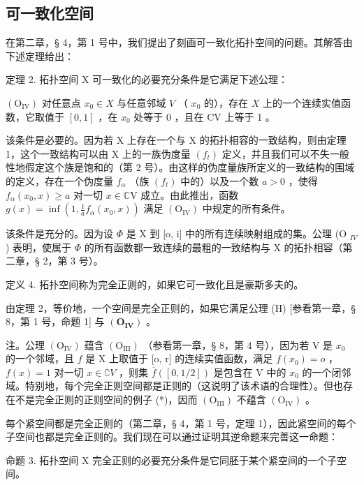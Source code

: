 \subsection{可一致化空间}

在第二章，§ 4，第 1 号中，我们提出了刻画可一致化拓扑空间的问题。其解答由下述定理给出：

定理 2. 拓扑空间 X 可一致化的必要充分条件是它满足下述公理：

\((\mathrm{O}_{\mathrm{IV}})\) 对任意点 \(x_0 \in X\) 与任意邻域 \(V\) （ \(x_0\) 的），存在 \(X\) 上的一个连续实值函数，它取值于 \([0,1]\) ，在 \(x_0\) 处等于 0 ，且在 CV 上等于 1 。

该条件是必要的。因为若 X 上存在一个与 X 的拓扑相容的一致结构，则由定理 1，这个一致结构可以由 X 上的一族伪度量 \((f_{t})\) 定义，并且我们可以不失一般性地假定这个族是饱和的（第 2 号）。由这样的伪度量族所定义的一致结构的围域的定义，存在一个伪度量 \(f_{\alpha}\) （族 \((f_{t})\) 中的）以及一个数 \(a > 0\) ，使得 \(f_{\alpha}(x_0, x) \geqslant a\) 对一切 \(x \in \mathbb{C}\mathrm{V}\) 成立。由此推出，函数 \(g(x) = \inf \left(1, \frac{1}{a} f_{\alpha}(x_0, x)\right)\) 满足 \((\mathrm{O}_{\mathrm{IV}})\) 中规定的所有条件。

该条件是充分的。因为设 \(\Phi\) 是 X 到 {[}o, i{]} 中的所有连续映射组成的集。公理 (O \(_{IV}\) ) 表明，使属于 \(\Phi\) 的所有函数都一致连续的最粗的一致结构与 X 的拓扑相容（第二章，§ 2，第 3 号）。

定义 4. 拓扑空间称为完全正则的，如果它可一致化且是豪斯多夫的。

由定理 2，等价地，一个空间是完全正则的，如果它满足公理 (H) {[}参看第一章，§ 8，第 1 号，命题 1{]} 与 \((\mathbf{O}_{\mathbf{IV}})\) 。

注。公理 \((\mathrm{O}_{\mathrm{IV}})\) 蕴含 \((\mathrm{O}_{\mathrm{III}})\) （参看第一章，§ 8，第 4 号），因为若 V 是 \(x_0\) 的一个邻域，且 \(f\) 是 X 上取值于 {[}o, r{]} 的连续实值函数，满足 \(f(x_0) = o\) ，\(f(x) = 1\) 对一切 \(x \in \complement V\) ，则集 \(\overline{f}([0, 1/2])\) 是包含在 V 中的 \(x_0\) 的一个闭邻域。特别地，每个完全正则空间都是正则的（这说明了该术语的合理性）。但也存在不是完全正则的正则空间的例子 (*)，因而 \((\mathrm{O}_{\mathrm{III}})\) 不蕴含 \((\mathrm{O}_{\mathrm{IV}})\) 。

每个紧空间都是完全正则的（第二章，§ 4，第 1 号，定理 1），因此紧空间的每个子空间也都是完全正则的。我们现在可以通过证明其逆命题来完善这一命题：

命题 3. 拓扑空间 X 完全正则的必要充分条件是它同胚于某个紧空间的一个子空间。

